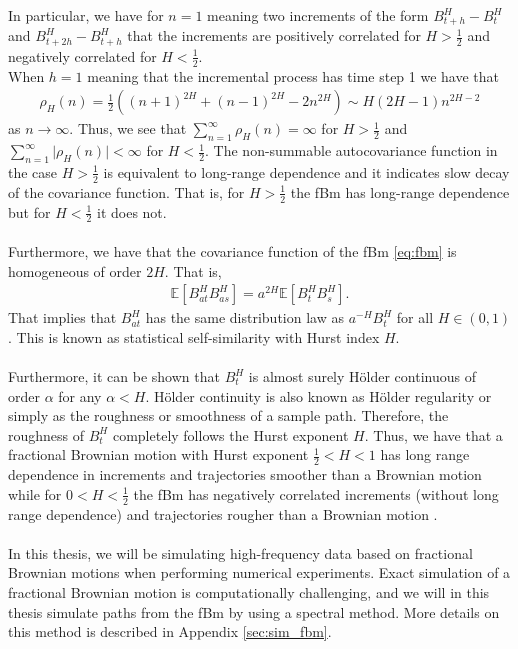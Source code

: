 \documentclass{article}
\begin{document}
In particular, we have for $n=1$ meaning two increments of the form $B^H_{t+h}-B^H_{t}$ and $B^H_{t+2h}-B^H_{t+h}$ that the increments are positively correlated for $H>\frac{1}{2}$ and negatively correlated for $H<\frac{1}{2}$.\\
When $h=1$ meaning that the incremental process has time step 1 we have that
\begin{align*}
\rho_H(n) = \frac{1}{2}\left( (n+1)^{2H} +(n-1)^{2H} -2n^{2H}\right) \sim H(2H-1)n^{2H-2}
\end{align*}
as $n\rightarrow \infty$. Thus, we see that $\sum_{n=1}^\infty \rho_H(n) =\infty$ for $H>\frac{1}{2}$ and $\sum_{n=1}^\infty \lvert \rho_H(n) \rvert <\infty$ for $H<\frac{1}{2}$. The non-summable autocovariance function in the case $H>\frac{1}{2}$ is equivalent to long-range dependence and it indicates slow decay of the covariance function. That is, for $H>\frac{1}{2}$ the fBm has long-range dependence but for $H<\frac{1}{2}$ it does not. \\\\
Furthermore, we have that the covariance function of the fBm \eqref{eq:fbm} is homogeneous of order $2H$. That is, 
\begin{align*}
\mathbb{E}\left[B_{at}^HB_{as}^H\right] = a^{2H} \mathbb{E}\left[B_t^HB_s^H\right].
\end{align*}
That implies that $B_{at}^H$ has the same distribution law as $a^{-H}B_t^H$ for all $H\in (0,1)$. This is known as statistical self-similarity with Hurst index $H$.\\\\
Furthermore, it can be shown that $B_t^H$ is almost surely Hölder continuous of order $\alpha$ for any $\alpha < H$. Hölder continuity is also known as Hölder regularity or simply as the roughness or smoothness of a sample path. Therefore, the roughness of $B_t^H$ completely follows the Hurst exponent $H$. Thus, we have that a fractional Brownian motion with Hurst exponent $\frac{1}{2}<H<1$ has long range dependence in increments and trajectories smoother than a Brownian motion while for $0<H<\frac{1}{2}$ the fBm has negatively correlated increments (without long range dependence) and trajectories rougher than a Brownian motion \cite{biagini2008}.\\\\
In this thesis, we will be simulating high-frequency data based on fractional Brownian motions when performing numerical experiments. Exact simulation of a fractional Brownian motion is computationally challenging, and we will in this thesis simulate paths from the fBm by using a spectral method. More details on this method is described in Appendix \ref{sec:sim_fbm}.
\end{document}
